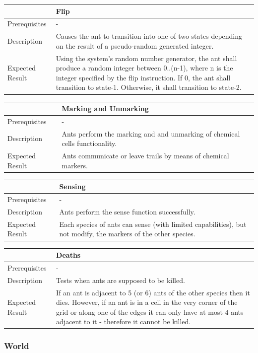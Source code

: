 \documentclass[11pt]{article}
\begin{document}
\begin{longtable}[c]{@{}p{}p{}@{}}
\toprule
& Flip \tabularnewline
\midrule
Prerequisites & - \tabularnewline
Description & Causes the ant to transition into one of two states
depending on the result of a pseudo-random generated integer. \tabularnewline
Expected Result & Using the system's random number generator, the ant
shall produce a random integer between 0..(n-1), where n is the integer
specified by the flip instruction. If 0, the ant shall transition to
state-1. Otherwise, it shall transition to state-2.\tabularnewline
\bottomrule
\end{longtable}

\begin{longtable}[c]{@{}p{}p{}@{}}
\toprule
& Marking and Unmarking \tabularnewline
\midrule
Prerequisites & - \tabularnewline
Description & Ants perform the marking and and unmarking of chemical
cells functionality. \tabularnewline
Expected Result & Ants communicate or leave trails by means of chemical
markers.\tabularnewline
\bottomrule
\end{longtable}

\begin{longtable}[c]{@{}p{}p{}@{}}
\toprule
& Sensing \tabularnewline
\midrule
Prerequisites & - \tabularnewline
Description & Ants perform the sense function successfully. \tabularnewline
Expected Result & Each species of ants can sense (with limited
capabilities), but not modify, the markers of the other species.\tabularnewline
\bottomrule
\end{longtable}

\begin{longtable}[c]{@{}p{}p{}@{}}
\toprule
& Deaths \tabularnewline
\midrule
Prerequisites & - \tabularnewline
Description & Tests when ants are supposed to be killed. \tabularnewline
Expected Result & If an ant is adjacent to 5 (or 6) ants of the other
species then it dies. However, if an ant is in a cell in the very corner
of the grid or along one of the edges it can only have at most 4 ants
adjacent to it - therefore it cannot be killed.\tabularnewline
\bottomrule
\end{longtable}

\subsubsection{World}\label{world}
\end{document}
